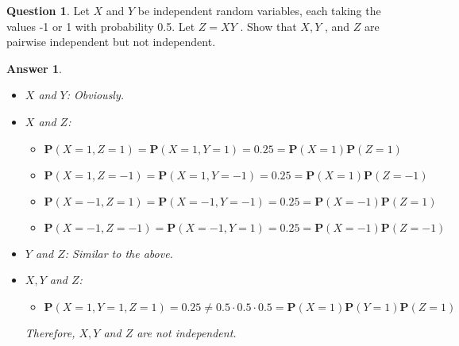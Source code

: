 \documentclass[utf8]{article}
\theoremstyle{definition}%
\newtheorem{question}{Question} %
\theoremstyle{plain}%
\newtheorem{answer}{Answer} %
\begin{document}
\begin{question}
    Let $X$ and $Y$ be independent random variables, each taking the values -1 or 1 with probability 0.5. Let $Z = XY$ . Show that $X, Y$ , and $Z$ are pairwise independent but not independent.
\end{question}
\begin{answer} ~
    \begin{itemize}
        \item $X$ and $Y$: Obviously.
        \item $X$ and $Z$: \begin{itemize}
            \item $\mathbf{P}(X = 1, Z = 1) = \mathbf{P}(X = 1, Y = 1) = 0.25 = \mathbf{P}(X = 1) \mathbf{P}(Z = 1)$
            \item $\mathbf{P}(X = 1, Z = -1) = \mathbf{P}(X = 1, Y = -1) = 0.25 = \mathbf{P}(X = 1) \mathbf{P}(Z = -1)$
            \item $\mathbf{P}(X = -1, Z = 1) = \mathbf{P}(X = -1, Y = -1) = 0.25 = \mathbf{P}(X = -1) \mathbf{P}(Z = 1)$
            \item $\mathbf{P}(X = -1, Z = -1) = \mathbf{P}(X = -1, Y = 1) = 0.25 = \mathbf{P}(X = -1) \mathbf{P}(Z = -1)$
        \end{itemize}
        \item $Y$ and $Z$: Similar to the above.
        \item $X, Y$ and $Z$: \begin{itemize}
            \item $\mathbf{P}(X = 1, Y = 1, Z = 1) = 0.25 \neq 0.5 \cdot 0.5 \cdot 0.5 = \mathbf{P}(X = 1) \mathbf{P}(Y = 1) \mathbf{P}(Z = 1)$
        \end{itemize}
        Therefore, $X, Y$ and $Z$ are not independent.
    \end{itemize}
\end{answer}
\end{document}
